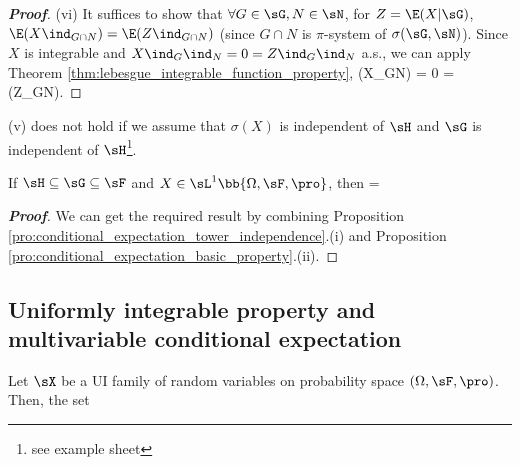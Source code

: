 \begin{proof}[\bf Proof]
\item [(vi)] It suffices to show that $\forall G\in \sG,N\in \sN$, for $Z= \E(X|\sG)$, $\E(X\ind_{G\cap N}) = \E(Z\ind_{G\cap N})$ (since $G\cap N$ is $\pi$-system of $\sigma(\sG,\sN)$). Since $X$ is integrable and $X\ind_G\ind_N = 0 = Z\ind_G\ind_N$ a.s., we can apply Theorem \ref{thm:lebesgue_integrable_function_property}, %
\be
\E(X\ind_{G\cap N}) = 0 = \E(Z\ind_{G\cap N}). %
\ee
\een
\end{proof}

\begin{remark}
(v) does not hold if we assume that $\sigma(X)$ is independent of $\sH$ and $\sG$ is independent of $\sH$\footnote{see example sheet}.
\end{remark}

\begin{proposition}
If $\sH\subseteq \sG \subseteq \sF$ and $X\in \sL^1\bb{\Omega,\sF,\pro}$, then
\be
\E{} = \E{} 
\ee
\end{proposition}

\begin{proof}[\bf Proof]
We can get the required result by combining Proposition \ref{pro:conditional_expectation_tower_independence}.(i) and Proposition \ref{pro:conditional_expectation_basic_property}.(ii).
\end{proof}




\subsection{Uniformly integrable property and multivariable conditional expectation}

\begin{theorem}\label{thm:ui_conditional_expectation_implies_ui}
Let $\sX$ be a UI family of random variables on probability space $(\Omega,\sF,\pro)$. Then, the set
\be
{} \quad {}
\ee
\end{theorem}

